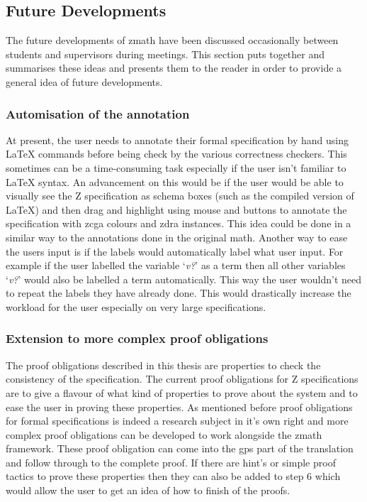 \subsection{Future Developments}
\label{subsec:futuredevelopments}

The future developments of \gls{zmath} have been discussed occasionally between
students and supervisors during meetings. This section puts together and
summarises these ideas and presents them to the reader in order to provide a
general idea of future developments.

\subsubsection{Automisation of the annotation}
\label{subsubsec:automisation}

At present, the user needs to annotate their formal specification by hand using
\LaTeX{} commands before being check by the various correctness checkers. This
sometimes can be a time-consuming task especially if the user isn't familiar to
\LaTeX{} syntax. An advancement on this would be if the user would be able to
visually see the Z specification as schema boxes (such as the compiled version
of \LaTeX{}) and then drag and highlight using mouse and buttons to annotate the
specification with \gls{zcga} colours and \gls{zdra} instances. This idea could
be done in a similar way to the annotations done in the original \gls{math}.
Another way to ease the users input is if the labels would automatically label
what user input. For example if the user labelled the variable `\emph{v?}' as a
term then all other variables `\emph{v?}' would also be labelled a term
automatically. This way the user wouldn't need to repeat the labels they have
already done. This would drastically increase the workload for the user
especially on very large specifications.

\subsubsection{Extension to more complex proof obligations}
\label{subsubsec:extenproofobli}

The proof obligations described in this thesis are properties to check the
consistency of the specification. The current proof obligations for Z
specifications are to give a flavour of what kind of properties to prove about
the system and to ease the user in proving these properties. As mentioned before
proof obligations for formal specifications is indeed a research subject in it's
own right and more complex proof obligations can be developed to work alongside
the \gls{zmath} framework. These proof obligation can come into the \gls{gps}
part of the translation and follow through to the complete proof. If there are
hint's or simple proof tactics to prove these properties then they can also be
added to step 6 which would allow the user to get an idea of how to finish of
the proofs.

